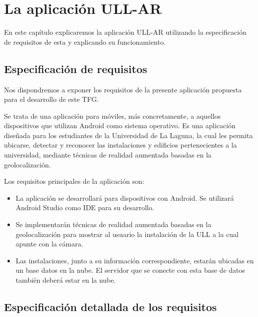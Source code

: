 
%
%
%

\chapter{La aplicación ULL-AR} \label{chap:LaAplicacion} 

En este capítulo explicaremos la aplicación ULL-AR utilizando la especificación de requisitos de esta y explicando su funcionamiento.

\section{Especificación de requisitos} %

Nos dispondremos a exponer los requisitos de la presente aplicación propuesta para el desarrollo de este TFG.

Se trata de una aplicación para móviles, más concretamente, a aquellos dispositivos que utilizan Android como sistema operativo. Es una aplicación diseñada para los estudiantes de la Universidad de La Laguna, la cual les permita ubicarse, detectar y reconocer las instalaciones y edificios pertenecientes a la universidad, mediante técnicas de realidad aumentada basadas en la geolocalización.

Los requisitos principales de la aplicación son:
\begin{itemize}
    \item La aplicación se desarrollará para dispositivos con Android. Se utilizará Android Studio como IDE para su desarrollo.
    \item Se implementarán técnicas de realidad aumentada basadas en la geolocalización para mostrar al usuario la instalación de la ULL a la cual apunte con la cámara.
    \item Las instalaciones, junto a su información correspondiente, estarán ubicadas en un base datos en la nube. El servidor que se conecte con esta base de datos también deberá estar en la nube.
\end{itemize}

\section{Especificación detallada de los requisitos} 

